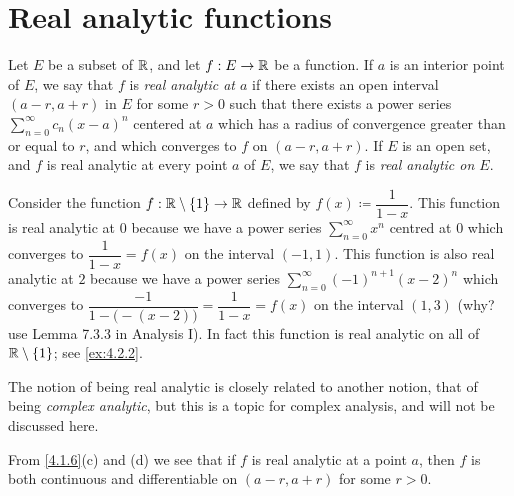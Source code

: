 \section{Real analytic functions}\label{sec:4.2}

\begin{defn}\label{4.2.1}
  Let \(E\) be a subset of \(\mathbb{R}\), and let \(f : E \to \mathbb{R}\) be a function.
  If \(a\) is an interior point of \(E\), we say that \(f\) is \emph{real analytic at \(a\)} if there exists an open interval \((a - r, a + r)\) in \(E\) for some \(r > 0\) such that there exists a power series \(\sum_{n = 0}^\infty c_n (x - a)^n\) centered at \(a\) which has a radius of convergence greater than or equal to \(r\), and which converges to \(f\) on \((a - r, a + r)\).
  If \(E\) is an open set, and \(f\) is real analytic at every point \(a\) of \(E\), we say that \(f\) is \emph{real analytic on \(E\)}.
\end{defn}

\begin{eg}\label{4.2.2}
  Consider the function \(f : \mathbb{R} \setminus \{1\} \to \mathbb{R}\) defined by \(f(x) \coloneqq \dfrac{1}{1 - x}\).
  This function is real analytic at \(0\) because we have a power series \(\sum_{n = 0}^\infty x^n\) centred at \(0\) which converges to \(\dfrac{1}{1 - x} = f(x)\) on the interval \((-1, 1)\).
  This function is also real analytic at \(2\) because we have a power series \(\sum_{n = 0}^\infty (-1)^{n + 1} (x - 2)^n\) which converges to \(\dfrac{-1}{1 - \big(-(x - 2)\big)} = \dfrac{1}{1 - x} = f(x)\) on the interval \((1, 3)\)
  (why? use Lemma 7.3.3 in Analysis I).
  In fact this function is real analytic on all of \(\mathbb{R} \setminus \{1\}\);
  see \cref{ex:4.2.2}.
\end{eg}

\begin{rmk}\label{4.2.3}
  The notion of being real analytic is closely related to another notion, that of being \emph{complex analytic}, but this is a topic for complex analysis, and will not be discussed here.
\end{rmk}

\begin{note}
  From \cref{4.1.6}(c) and (d) we see that if \(f\) is real analytic at a point \(a\), then \(f\) is both continuous and diﬀerentiable on \((a - r, a + r)\) for some \(r > 0\).
\end{note}

